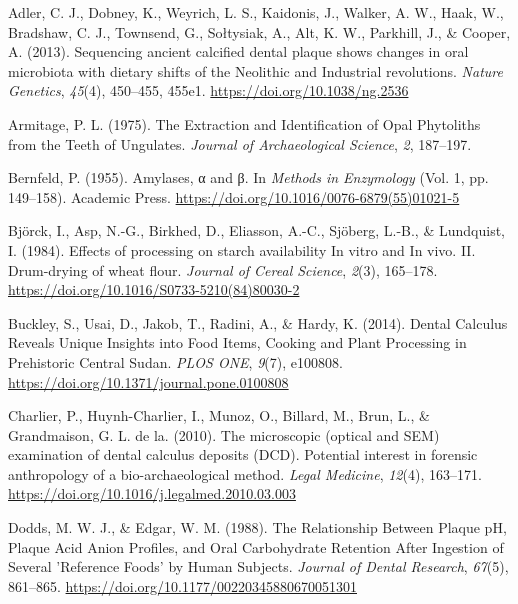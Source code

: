 \documentclass[
  letterpaper,
]{book}
\newlength{\cslhangindent}
\newlength{\cslentryspacingunit} %
\newenvironment{CSLReferences}[2] %
 {%
  \setlength{\parindent}{0pt}
  \ifodd #1
  \let\oldpar\par
  \def\par{\hangindent=\cslhangindent\oldpar}
  \fi
  \setlength{\parskip}{#2\cslentryspacingunit}
 }%
 {}
\begin{document}
\hypertarget{refs-4}{}
\begin{CSLReferences}{1}{0}
\leavevmode{}%
Adler, C. J., Dobney, K., Weyrich, L. S., Kaidonis, J., Walker, A. W.,
Haak, W., Bradshaw, C. J., Townsend, G., Sołtysiak, A., Alt, K. W.,
Parkhill, J., \& Cooper, A. (2013). Sequencing ancient calcified dental
plaque shows changes in oral microbiota with dietary shifts of the
{Neolithic} and {Industrial} revolutions. \emph{Nature Genetics},
\emph{45}(4), 450--455, 455e1. \url{https://doi.org/10.1038/ng.2536}

\leavevmode{}%
Armitage, P. L. (1975). The {Extraction} and {Identification} of {Opal
Phytoliths} from the {Teeth} of {Ungulates}. \emph{Journal of
Archaeological Science}, \emph{2}, 187--197.

\leavevmode{}%
Bernfeld, P. (1955). Amylases, α and β. In \emph{Methods in
{Enzymology}} (Vol. 1, pp. 149--158). {Academic Press}.
\url{https://doi.org/10.1016/0076-6879(55)01021-5}

\leavevmode{}%
Björck, I., Asp, N.-G., Birkhed, D., Eliasson, A.-C., Sjöberg, L.-B., \&
Lundquist, I. (1984). Effects of processing on starch availability {In}
vitro and {In} vivo. {II}. {Drum-drying} of wheat flour. \emph{Journal
of Cereal Science}, \emph{2}(3), 165--178.
\url{https://doi.org/10.1016/S0733-5210(84)80030-2}

\leavevmode{}%
Buckley, S., Usai, D., Jakob, T., Radini, A., \& Hardy, K. (2014).
Dental {Calculus Reveals Unique Insights} into {Food Items}, {Cooking}
and {Plant Processing} in {Prehistoric Central Sudan}. \emph{PLOS ONE},
\emph{9}(7), e100808. \url{https://doi.org/10.1371/journal.pone.0100808}

\leavevmode{}%
Charlier, P., Huynh-Charlier, I., Munoz, O., Billard, M., Brun, L., \&
Grandmaison, G. L. de la. (2010). The microscopic (optical and {SEM})
examination of dental calculus deposits ({DCD}). {Potential} interest in
forensic anthropology of a bio-archaeological method. \emph{Legal
Medicine}, \emph{12}(4), 163--171.
\url{https://doi.org/10.1016/j.legalmed.2010.03.003}

\leavevmode{}%
Dodds, M. W. J., \& Edgar, W. M. (1988). The {Relationship Between
Plaque pH}, {Plaque Acid Anion Profiles}, and {Oral Carbohydrate
Retention After Ingestion} of {Several} '{Reference Foods}' by {Human
Subjects}. \emph{Journal of Dental Research}, \emph{67}(5), 861--865.
\url{https://doi.org/10.1177/00220345880670051301}


\end{CSLReferences}
\end{document}
